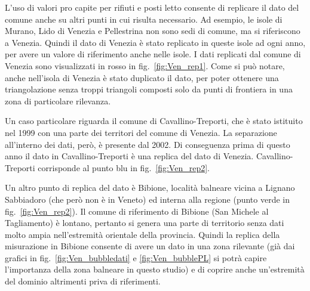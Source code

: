 \documentclass[a4paper,11pt,twoside,openright]{book}							%
\begin{document}
L'uso di valori pro capite per rifiuti e posti letto consente di replicare il dato del comune anche su altri punti in cui risulta necessario. Ad esempio, le isole di Murano, Lido di Venezia e Pellestrina non sono sedi di comune, ma si riferiscono a Venezia. Quindi il dato di Venezia è stato replicato in queste isole ad ogni anno, per avere un valore di riferimento anche nelle isole. I dati replicati dal comune di Venezia sono visualizzati in rosso in fig.~\ref{fig:Ven_rep1}. Come si può notare, anche nell'isola di Venezia è stato duplicato il dato, per poter ottenere una triangolazione senza troppi triangoli composti solo da punti di frontiera in una zona di particolare rilevanza. 

Un caso particolare riguarda il comune di Cavallino-Treporti, che è stato istituito nel 1999 con una parte dei territori del comune di Venezia. La separazione all'interno dei dati, però, è presente dal 2002. Di conseguenza prima di questo anno il dato in Cavallino-Treporti è una replica del dato di Venezia. Cavallino-Treporti corrisponde al punto blu in fig.~\ref{fig:Ven_rep2}.

Un altro punto di replica del dato è Bibione, località balneare vicina a Lignano Sabbiadoro (che però non è in Veneto) ed interna alla regione (punto verde in fig.~\ref{fig:Ven_rep2}). Il comune di riferimento di Bibione (San Michele al Tagliamento) è lontano, pertanto si genera una parte di territorio senza dati molto ampia nell'estremità orientale della provincia. Quindi la replica della misurazione in Bibione consente di avere un dato in una zona rilevante (già dai grafici in fig.~\ref{fig:Ven_bubbledati} e \ref{fig:Ven_bubblePL} si potrà capire l'importanza della zona balneare in questo studio) e di coprire anche un'estremità del dominio altrimenti priva di riferimenti.
\end{document}
